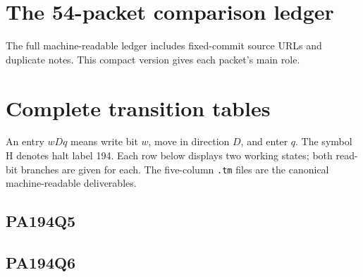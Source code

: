\documentclass[11pt,letterpaper]{article}
\begin{document}
\clearpage
\section{The 54-packet comparison ledger}
\label{app:ledger}
The full machine-readable ledger includes fixed-commit source URLs and
duplicate notes. This compact version gives each packet's main role.


\clearpage
\section{Complete transition tables}
\label{app:tables}
An entry $wDq$ means write bit $w$, move in direction $D$, and enter $q$.
The symbol H denotes halt label 194. Each row below displays two working
states; both read-bit branches are given for each. The five-column
\texttt{.tm} files are the canonical machine-readable deliverables.
\subsection{PA194Q5}

\clearpage
\subsection{PA194Q6}

\end{document}
